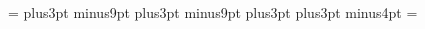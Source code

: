 \def\tenpt{%
	\initfam\rmfam\tenrm\sevenrm\fiverm
	\initfam\mitfam\teni\seveni\fivei
	\initfam\syfam\tensy\sevensy\fivesy
	\initfam\itfam\tenit\nullfont\nullfont
	\initfam\slfam\tensl\nullfont\nullfont
	\initfam\bffam\tenbf\sevenbf\fivebf
	\initfam\ttfam\tentt\nullfont\nullfont
	\initfam\scfam\tensc\nullfont\nullfont
	\initfam\ssfam\tenss\nullfont\nullfont
	\initfam\bbfam\tenbb\sevenbb\fivebb
	\initfam\scrfam\tenscr\sevenscr\fivescr
	\initfam\eucalfam\teneucal\seveneucal\fiveeucal
	\initfam\bmitfam\tenbmit\sevenbmit\fivebmit
	\def\rm{\fam=\rmfam \tenrm}%
	\def\it{\fam=\itfam \tenit}%
	\def\sl{\fam=\slfam \tensl}%
	\def\bf{\fam=\bffam \tenbf}%
	\def\tt{\fam=\ttfam \tentt}%
	\def\sc{\fam=\scfam \tensc}%
	\def\ss{\fam=\ssfam \tenss}%
	\setbox\strutbox=\hbox{\vrule height8.5pt depth3.5pt width0pt}%
	\abovedisplayskip=12pt plus3pt minus9pt
	\belowdisplayskip=12pt plus3pt minus9pt
	\abovedisplayshortskip=0pt plus3pt
	\belowdisplayshortskip=7pt plus3pt minus4pt
	\normalbaselineskip=12pt
	\normalbaselines\rm}

\def\ninept{%
	\initfam\rmfam\ninerm\sixrm\fiverm
	\initfam\mitfam\ninei\sixi\fivei
	\initfam\syfam\ninesy\sixsy\fivesy
	\initfam\itfam\nineit\nullfont\nullfont
	\initfam\slfam\ninesl\nullfont\nullfont
	\initfam\bffam\ninebf\sixbf\fivebf
	\initfam\ttfam\ninett\nullfont\nullfont
	\initfam\scfam\ninesc\nullfont\nullfont
	\initfam\ssfam\niness\nullfont\nullfont
	\initfam\bbfam\ninebb\sixbb\fivebb
	\initfam\scrfam\ninescr\sixscr\fivescr
	\initfam\eucalfam\nineeucal\sixeucal\fiveeucal
	\initfam\bmitfam\ninebmit\sixbmit\fivebmit
	\def\rm{\fam=\rmfam \ninerm}%
	\def\it{\fam=\itfam \nineit}%
	\def\sl{\fam=\slfam \ninesl}%
	\def\bf{\fam=\bffam \ninebf}%
	\def\tt{\fam=\ttfam \ninett}%
	\def\sc{\fam=\scfam \ninesc}%
	\def\ss{\fam=\ssfam \niness}%
	\setbox\strutbox=\hbox{\vrule height8pt depth3pt width0pt}%
	\abovedisplayskip=10pt plus3pt minus7pt
	\belowdisplayskip=10pt plus3pt minus7pt
	\abovedisplayshortskip=0pt plus3pt
	\belowdisplayshortskip=6pt plus3pt minus3pt
	\normalbaselineskip=11pt
	\normalbaselines\rm}

\tenpt



\def\hugeskip{\vskip\hugeskipamount}
\def\hugebreak{\par \ifdim\lastskip<\hugeskipamount
	\removelastskip \penalty-400 \hugeskip \fi}

\def\revskip{\par\removelastskip\vskip}
\def\resmallskip{\revskip\smallskipamount}
\def\remedskip{\revskip\medskipamount}
\def\rebigskip{\revskip\bigskipamount}
\def\rehugeskip{\revskip\hugeskipamount}

